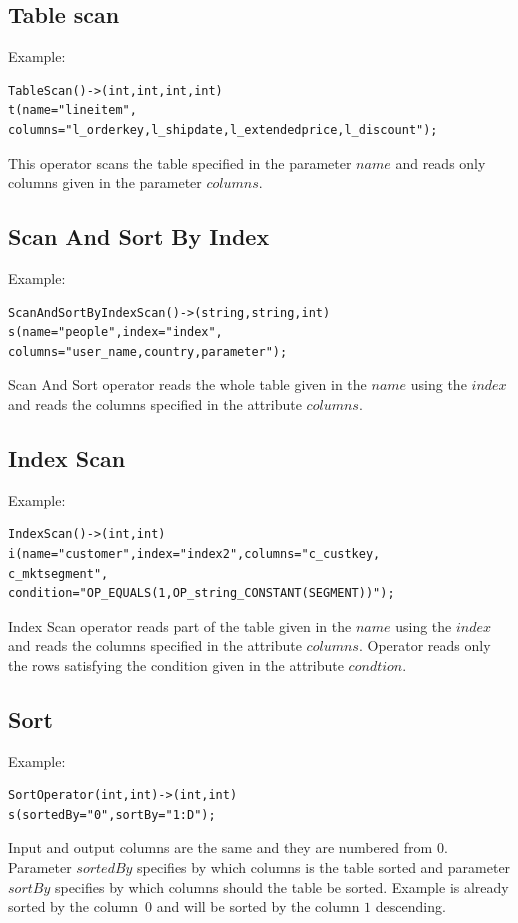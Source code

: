 \subsection{Table scan}
Example:
\begin{lstlisting}
TableScan()->(int,int,int,int)
t(name="lineitem",
columns="l_orderkey,l_shipdate,l_extendedprice,l_discount");
\end{lstlisting}
This operator scans the table specified in the parameter $name$ and reads only columns given in the parameter $columns$.

\subsection{Scan And Sort By Index}
Example:
\begin{lstlisting}
ScanAndSortByIndexScan()->(string,string,int)
s(name="people",index="index",
columns="user_name,country,parameter"); 
\end{lstlisting}
Scan And Sort operator reads the whole table given in the $name$ using the $index$ and reads the columns specified in the attribute $columns$.

\subsection{Index Scan}

Example:
\begin{lstlisting}
IndexScan()->(int,int)
i(name="customer",index="index2",columns="c_custkey,
c_mktsegment",
condition="OP_EQUALS(1,OP_string_CONSTANT(SEGMENT))");
\end{lstlisting}
Index Scan operator reads part of the table given in the $name$ using the $index$ and reads the columns specified in the attribute $columns$. Operator reads only the rows satisfying the condition given in the attribute $condtion$.



\subsection{Sort}
Example:
\begin{lstlisting}
SortOperator(int,int)->(int,int)
s(sortedBy="0",sortBy="1:D");
\end{lstlisting}
Input and output columns are the same and they are numbered from $0$. Parameter $sortedBy$ specifies by which columns is the table sorted and parameter $sortBy$ specifies by which columns should the table be sorted. Example is already sorted by the column~$0$ and will be sorted by the column $1$ descending.


